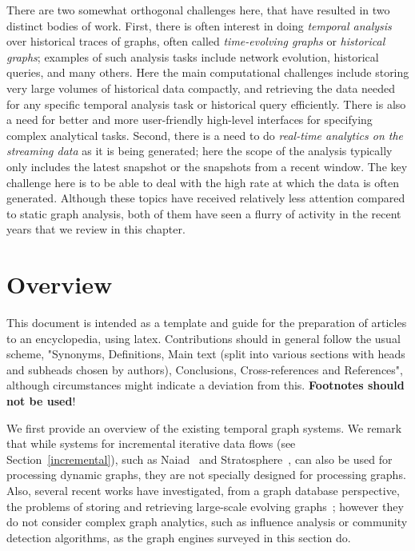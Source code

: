 \documentclass{svjour3}
\begin{document}
There are two somewhat orthogonal challenges here, that have resulted in two distinct bodies of work. First, there is often interest in doing {\em temporal analysis} over historical traces of graphs, often called {\em time-evolving graphs} or {\em historical graphs}; examples of such analysis tasks include network evolution, historical queries, and many others. Here the main computational challenges include storing very large volumes of historical data compactly, and retrieving the data needed for any specific temporal analysis task or historical query efficiently. There is also a need for better and more user-friendly high-level interfaces for specifying complex analytical tasks.
Second, there is a need to do {\em real-time analytics on the streaming data} as it is being generated; here the scope of the analysis typically only includes the latest snapshot or the snapshots from a recent window. The key challenge here is to be able to deal with the high rate at which the data is often generated. Although these topics have received relatively less attention compared to static graph analysis,
both of them have seen a flurry of activity in the recent years that we review in this chapter.




\section{Overview}
This document is intended as a template and guide for the preparation of articles to an encyclopedia, using latex. Contributions should in general follow the usual scheme, "Synonyms, Definitions, Main text (split into various sections with heads and subheads chosen by authors), Conclusions, Cross-references and References", although circumstances might indicate a deviation from this. 
{\bf Footnotes should not be used}!


We first provide an overview of the existing temporal graph systems. We remark that while systems for incremental iterative data flows (see Section~\ref{incremental}), such as Naiad~\cite{naiad} and Stratosphere~\cite{stratosphere}, can also be used for processing dynamic graphs, they are not specially
designed for processing graphs. Also, several recent works have investigated, from a graph database perspective, the problems of storing and retrieving large-scale evolving graphs~\cite{Mondal2012,RenLKZC11:QueryEvolveGraph}; however they do not consider complex graph analytics, such as influence analysis or community detection algorithms, as the graph engines surveyed in this section do.
\end{document}
